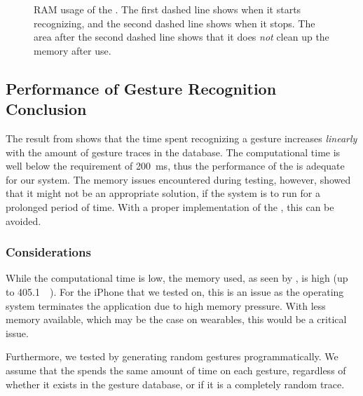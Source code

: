 \begin{figure}[!htb]
  \caption{RAM usage of the \threedollar. The first dashed line shows when it starts recognizing, and the second dashed line shows when it stops. The area after the second dashed line shows that it does \emph{not} clean up the memory after use.}
  \label{fig:threedollarmemory}
\end{figure}

\subsection{Performance of Gesture Recognition Conclusion}
The result from  shows that the time spent recognizing a gesture 
increases \emph{linearly} with the amount of gesture traces in the database.
The computational time is well below the requirement of \SI{200}{\milli\second},
thus the performance of the \threedollar is adequate for our system. 
The memory issues encountered during testing, however, 
showed that it might not be an appropriate solution, 
if the system is to run for a prolonged period of time.
With a proper implementation of the \threedollar, 
this can be avoided. 

\subsubsection{Considerations}
While the computational time is low, 
the memory used, as seen by , is high (up to \SI{405.1}{\mega\byte}). 
For the iPhone that we tested on, this is an issue as the operating system terminates the application due to high memory pressure. 
With less memory available, which may be the case on wearables,
this would be a critical issue.

Furthermore, we tested by generating random gestures programmatically. 
We assume that the \threedollar spends the same amount of time on each gesture, 
regardless of whether it exists in the gesture database, 
or if it is a completely random trace. 

